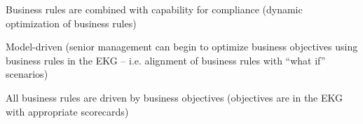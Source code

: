 \kgmmscoringlevelFour

\begin{scoring}

    \item Business rules are combined with  capability for compliance (dynamic optimization of
          business rules)
    \item Model-driven (senior management can begin to optimize business objectives using business rules in the EKG --
          i.e. alignment of business rules with “what if” scenarios)

\end{scoring}

\kgmmscoringlevelFive

\begin{scoring}

    \item All business rules are driven by business objectives (objectives are in the EKG with appropriate scorecards)

\end{scoring}
